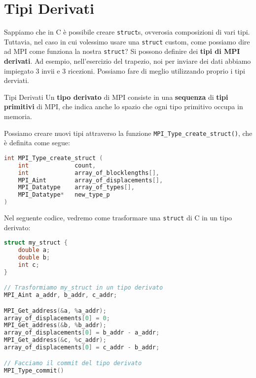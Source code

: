 \section{Tipi Derivati}

Sappiamo che in C è possibile creare \verb|struct|s, ovverosia composizioni di vari tipi. Tuttavia, nel caso in cui volessimo usare una \verb|struct| custom, come possiamo dire ad MPI come funziona la nostra \verb|struct|? Si possono definire dei \textbf{tipi di MPI derivati}. Ad esempio, nell'esercizio del trapezio, noi per inviare dei dati abbiamo impiegato 3 invii e 3 ricezioni. Possiamo fare di meglio utilizzando proprio i tipi derviati.

\begin{definition}{Tipi Derivati}
    Un \textbf{tipo derivato} di MPI consiste in una \textbf{sequenza} di \textbf{tipi primitivi} di MPI, che indica anche lo spazio che ogni tipo primitivo occupa in memoria.
\end{definition}

Possiamo creare nuovi tipi attraverso la funzione \verb|MPI_Type_create_struct()|, che è definita come segue:

\begin{lstlisting}[language = C, numbers = none]
int MPI_Type_create_struct (
    int             count,
    int             array_of_blocklengths[],
    MPI_Aint        array_of_displacements[],
    MPI_Datatype    array_of_types[],
    MPI_Datatype*   new_type_p
)\end{lstlisting}

Nel seguente codice, vedremo come trasformare una \verb|struct| di C in un tipo derivato:

\begin{codeblock}
    \begin{lstlisting}[language = C, numbers = none, columns=fullflexible]
struct my_struct {
    double a;
    double b;
    int c;
}

// Trasformiamo my_struct in un tipo derivato
MPI_Aint a_addr, b_addr, c_addr;

MPI_Get_address(&a, %a_addr);
array_of_displacements[0] = 0;
MPI_Get_address(&b, %b_addr);
array_of_displacements[0] = b_addr - a_addr;
MPI_Get_address(&c, %c_addr);
array_of_displacements[0] = c_addr - b_addr;

// Facciamo il commit del tipo derivato
MPI_Type_commit()
    \end{lstlisting}
\end{codeblock}